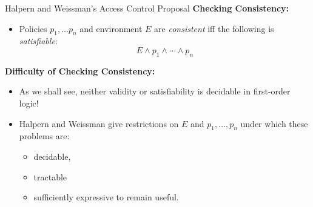 \documentclass[style=sailor,size=12pt]{powerdot}
\begin{document}
\begin{wideslide}[bm=,toc=]{Halpern and Weissman's Access Control Proposal}
\textbf{Checking Consistency:}
\begin{itemize}
\item Policies $p_1,\dots p_n$ and environment $E$ are {\em consistent\/} iff
the following is {\em satisfiable\/}:
\begin{displaymath}
E\wedge p_1 \wedge \cdots \wedge p_n 
\end{displaymath}
\end{itemize}
\pause
\textbf{Difficulty of Checking Consistency:}
\begin{itemize}
\item<3-> As we shall see, neither validity or satisfiability is decidable in first-order logic!
\item<4-> Halpern and Weissman give restrictions on $E$ and $p_1,\ldots ,p_n$ under which
these problems are:
\begin{itemize}
\item<5->decidable,
\item<5->tractable
\item<5->sufficiently expressive to remain useful. 
\end{itemize}
\end{itemize}
\end{wideslide}
\end{document}
